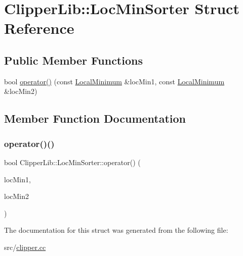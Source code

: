 \hypertarget{struct_clipper_lib_1_1_loc_min_sorter}{}\section{Clipper\+Lib\+::Loc\+Min\+Sorter Struct Reference}
\label{struct_clipper_lib_1_1_loc_min_sorter}
\subsection*{Public Member Functions}
\begin{DoxyCompactItemize}
\item 
bool \mbox{\hyperlink{struct_clipper_lib_1_1_loc_min_sorter_a4e5cd20cdd73b95700e91e61a8de5c06}{operator()}} (const \mbox{\hyperlink{struct_clipper_lib_1_1_local_minimum}{Local\+Minimum}} \&loc\+Min1, const \mbox{\hyperlink{struct_clipper_lib_1_1_local_minimum}{Local\+Minimum}} \&loc\+Min2)
\end{DoxyCompactItemize}


\subsection{Member Function Documentation}
\mbox{\label{struct_clipper_lib_1_1_loc_min_sorter_a4e5cd20cdd73b95700e91e61a8de5c06}} 
\subsubsection{\texorpdfstring{operator()()}{operator()()}}
{\footnotesize\ttfamily bool Clipper\+Lib\+::\+Loc\+Min\+Sorter\+::operator() (\begin{DoxyParamCaption}\item[{const \mbox{\hyperlink{struct_clipper_lib_1_1_local_minimum}{Local\+Minimum}} \&}]{loc\+Min1,  }\item[{const \mbox{\hyperlink{struct_clipper_lib_1_1_local_minimum}{Local\+Minimum}} \&}]{loc\+Min2 }\end{DoxyParamCaption})\hspace{0.3cm}{\ttfamily [inline]}}



The documentation for this struct was generated from the following file\+:\begin{DoxyCompactItemize}
\item 
src/\mbox{\hyperlink{clipper_8cc}{clipper.\+cc}}\end{DoxyCompactItemize}
